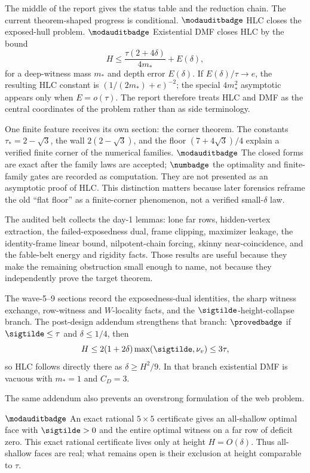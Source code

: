 The middle of the report gives the status table and the reduction chain.  The
current theorem-shaped progress is conditional.  \(\modauditbadge\)
HLC closes the exposed-hull problem.  \(\modauditbadge\) Existential DMF closes
HLC by the bound
\[
  H \leq \frac{\tau(2+4\delta)}{4m_*}+E(\delta),
\]
for a deep-witness mass \(m_*\) and depth error \(E(\delta)\).  If
\(E(\delta)/\tau\to e\), the resulting HLC constant is
\((1/(2m_*)+e)^{-2}\); the special \(4m_*^2\) asymptotic appears only when
\(E=o(\tau)\).  The report therefore treats HLC and DMF as the central
coordinates of the problem rather than as side terminology.

One finite feature receives its own section: the corner theorem.  The constants
\(\tau_*=2-\sqrt 3\), the wall \(2(2-\sqrt 3)\), and the floor
\((7+4\sqrt 3)/4\) explain a verified finite corner of the numerical
families.  \(\modauditbadge\) The closed forms are exact after the family laws
are accepted; \(\numbadge\) the optimality and finite-family gates are recorded
as computation.  They are not presented as an asymptotic proof of HLC.  This
distinction matters because later forensics reframe the old ``flat floor'' as
a finite-corner phenomenon, not a verified small-\(\delta\) law.

The audited belt collects the day-1 lemmas: lone far rows, hidden-vertex
extraction, the failed-exposedness dual, frame clipping, maximizer leakage,
the identity-frame linear bound, nilpotent-chain forcing, skinny
near-coincidence, and the fable-belt energy and rigidity facts.  Those results
are useful because they make the remaining obstruction small enough to name,
not because they independently prove the target theorem.

The wave-5--9 sections record the exposedness-dual identities, the sharp
witness exchange, row-witness and \(W\)-locality facts, and the
\(\sigtilde\)-height-collapse branch.  The post-design addendum strengthens
that branch: \(\provedbadge\) if \(\sigtilde\leq\tau\) and
\(\delta\leq1/4\), then
\[
  H\leq 2(1+2\delta)\max(\sigtilde,\nu_v)\leq 3\tau,
\]
so HLC follows directly there as \(\delta\geq H^2/9\).  In that branch
existential DMF is vacuous with \(m_*=1\) and \(C_D=3\).

The same addendum also prevents an overstrong formulation of the web problem.

\noindent\(\modauditbadge\) An exact rational \(5\times5\) certificate gives
an all-shallow optimal face with \(\sigtilde>0\) and the entire optimal witness
on a far row of deficit zero.  This exact rational certificate lives only at
height \(H=O(\delta)\).  Thus all-shallow faces are real; what remains open is
their exclusion at height comparable to \(\tau\).

